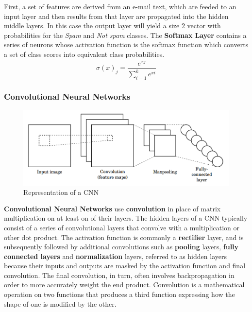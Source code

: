 \documentclass{scrartcl}
\begin{document}
    \newline
    First, a set of features are derived from an e-mail text, which are feeded to an input
    layer and then results from that layer are propagated into the hidden middle layers.
    In this case the output layer will yield a size 2 vector with probabilities for the 
    \textit{Spam} and \textit{Not spam} classes.
    The \textbf{Softmax Layer} contains a series of neurons whose activation function is
    the softmax function which converts a set of class scores into equivalent class
    probabilities.
    \begin{equation}
        \sigma(x)_j = \frac{e^{xj}}{\sum^k_{i=1} e^{xi} }
    \end{equation}
    \newpage
    \subsubsection{Convolutional Neural Networks}
    \begin{figure}[h!]
        \centering
        \includegraphics[scale=0.4]{cvnn.png}
        \caption{Representation of a CNN}
    \end{figure} 
    \textbf{Convolutional Neural Networks} use \textbf{convolution} in place of matrix
    multiplication on at least on of their layers. \newline
    The hidden layers of a CNN typically consist of a series of convolutional layers 
    that convolve with a multiplication or other dot product. 
    The activation function is commonly a \textbf{rectifier} layer, 
    and is subsequently followed by  additional convolutions such as \textbf{pooling} layers, 
    \textbf{fully connected layers} and \textbf{normalization} layers, 
    referred to as hidden layers because their inputs and outputs are masked by the activation 
    function and final convolution. The final convolution, in turn, often involves 
    backpropagation in order to more accurately weight the end product.
    Convolution  is a mathematical operation on two functions that produces a 
    third function expressing how the shape of one is modified by the other.
\end{document}

